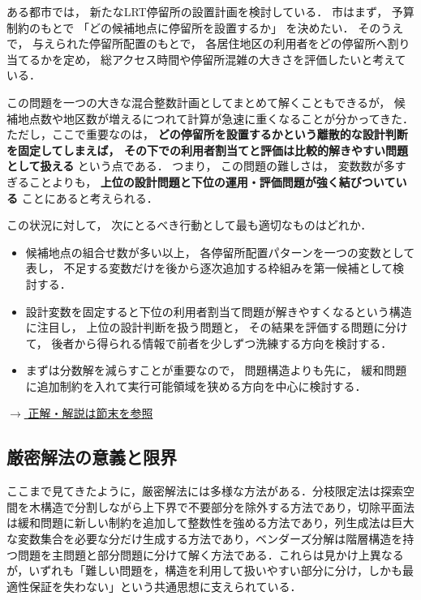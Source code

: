 \begin{example}[title={クイズ6：解法の選択2}]
ある都市では，
新たなLRT停留所の設置計画を検討している．
市はまず，
予算制約のもとで
「どの候補地点に停留所を設置するか」
を決めたい．
そのうえで，
与えられた停留所配置のもとで，
各居住地区の利用者をどの停留所へ割り当てるかを定め，
総アクセス時間や停留所混雑の大きさを評価したいと考えている．

この問題を一つの大きな混合整数計画としてまとめて解くこともできるが，
候補地点数や地区数が増えるにつれて計算が急速に重くなることが分かってきた．
ただし，ここで重要なのは，
\textbf{どの停留所を設置するかという離散的な設計判断を固定してしまえば，
その下での利用者割当てと評価は比較的解きやすい問題として扱える}
という点である．
つまり，
この問題の難しさは，
変数数が多すぎることよりも，
\textbf{上位の設計問題と下位の運用・評価問題が強く結びついている}
ことにあると考えられる．

この状況に対して，
次にとるべき行動として最も適切なものはどれか．

\begin{itemize}
\item[(ア)]
候補地点の組合せ数が多い以上，
各停留所配置パターンを一つの変数として表し，
不足する変数だけを後から逐次追加する枠組みを第一候補として検討する．

\item[(イ)]
設計変数を固定すると下位の利用者割当て問題が解きやすくなるという構造に注目し，
上位の設計判断を扱う問題と，
その結果を評価する問題に分けて，
後者から得られる情報で前者を少しずつ洗練する方向を検討する．

\item[(ウ)]
まずは分数解を減らすことが重要なので，
問題構造よりも先に，
緩和問題に追加制約を入れて実行可能領域を狭める方向を中心に検討する．
\end{itemize}

\hyperref[ans:strict-bd-one]{$\rightarrow$ 正解・解説は節末を参照}
\end{example}




\subsection{厳密解法の意義と限界}

ここまで見てきたように，厳密解法には多様な方法がある．分枝限定法は探索空間を木構造で分割しながら上下界で不要部分を除外する方法であり，切除平面法は緩和問題に新しい制約を追加して整数性を強める方法であり，列生成法は巨大な変数集合を必要な分だけ生成する方法であり，ベンダーズ分解は階層構造を持つ問題を主問題と部分問題に分けて解く方法である．これらは見かけ上異なるが，いずれも「難しい問題を，構造を利用して扱いやすい部分に分け，しかも最適性保証を失わない」という共通思想に支えられている．

